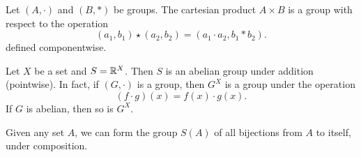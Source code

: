\begin{remarks}
    \item Let $(A, \cdot)$ and $(B, \ast)$ be groups.
        The cartesian product $A \times B$ is a group with respect to the
        operation \[
            (a_1, b_1) \star (a_2, b_2) = (a_1 \cdot a_2, b_1 \ast b_2).
        \] defined componentwise.
    \item Let $X$ be a set and $S = \mathbb{R}^X$.
        Then $S$ is an abelian group under addition (pointwise).
        In fact, if $(G, \cdot)$ is a group, then $G^X$ is a group
        under the operation \[
            (f \cdot g)(x) = f(x) \cdot g(x).
        \] If $G$ is abelian, then so is $G^X$.
    \item Given any set $A$, we can form the group $S(A)$ of all bijections
        from $A$ to itself, under composition.
\end{remarks}

